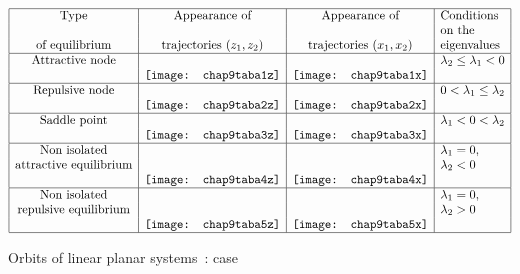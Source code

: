 \begin{table}
\hspace*{-5mm}
\begin{eqnarray*}
\begin{array}{|c|c|c|l|}
\hline
\mbox{Type}&\mbox{Appearance of}& \mbox{Appearance of} &\mbox{Conditions}\\&&& \mbox{on the}\\
\mbox{of equilibrium}&\mbox{trajectories }(z_1,z_2)&\mbox{trajectories }(x_1,x_2)&
\mbox{eigenvalues}\\
\hline
\mbox{Attractive node} & & &\lambda_2 \leq \lambda_1 < 0\\
&\mbox{\texttt{[image: chap9taba1z]}}&\mbox{\texttt{[image: chap9taba1x]}} &\\
\hline
\mbox{Repulsive node}& & & 0<\lambda_1\leq\lambda_2 \\
&\mbox{\texttt{[image: chap9taba2z]}}& \mbox{\texttt{[image: chap9taba2x]}} &\\
\hline
\mbox{Saddle point} & & & \lambda_1 < 0 < \lambda_2 \\
&\mbox{\texttt{[image: chap9taba3z]}}& \mbox{\texttt{[image: chap9taba3x]}}&\\
\hline
\mbox{Non isolated} && &\lambda _1 = 0,  \\
\mbox{attractive equilibrium}&&&\lambda_2 < 0\\
&\mbox{\texttt{[image: chap9taba4z]}}&\mbox{\texttt{[image: chap9taba4x]}} &\\
\hline
\mbox{Non isolated} && &\lambda _1 = 0, \\
\mbox{repulsive equilibrium}&&& \lambda_2 > 0 \\
&\mbox{\texttt{[image: chap9taba5z]}}& \mbox{\texttt{[image: chap9taba5x]}}&\\
\hline
\end{array}
\end{eqnarray*}
\caption{Orbits of linear planar systems~: case}
\label{tablea}
\end{table}

